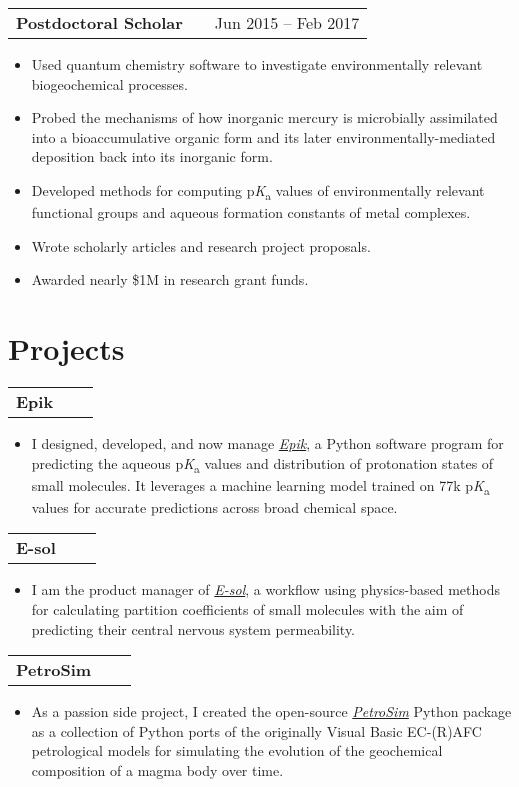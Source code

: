 \documentclass[a4paper,12pt]{article}
\makeatletter
\newenvironment{jobtitle}[2]
    {
    \vspace{4pt}
    \begin{tabularx}{\linewidth}{@{}l X r@{}}
    \textbf{#1} & \hfill &  #2 \\[3.75pt]
    \end{tabularx}
    \begin{minipage}[t]{\linewidth}
    \begin{itemize}[nosep, after=\strut, leftmargin=1em, itemsep=3pt, label=--]
    }
    {
    \end{itemize}
    \vspace{8pt}
    \end{minipage}
    }
\newenvironment{projecttitle}[1]
    {
    \begin{tabularx}{\linewidth}{@{}l X r@{}}
    \textbf{#1} & \hfill \\[3.75pt]
    \end{tabularx}
    }
    {
    }
\newenvironment{projectdescription}[0]
    {
    \vspace{4pt}
    \begin{minipage}[t]{\linewidth}
    \begin{itemize}[nosep, after=\strut, leftmargin=1em, itemsep=3pt]
    }
    {
    \end{itemize}
    \vspace{-8pt}
    \end{minipage}
    }
\makeatother
\begin{document}
\begin{jobtitle}{Postdoctoral Scholar}{Jun 2015 -- Feb 2017}
    \item Used quantum chemistry software to investigate environmentally relevant biogeochemical processes.
    \item Probed the mechanisms of how inorganic mercury is microbially assimilated into a bioaccumulative organic form and its later environmentally-mediated deposition back into its inorganic form.
    \item Developed methods for computing p\textit{K}\textsubscript{a} values of environmentally relevant functional groups and aqueous formation constants of metal complexes.
    \item Wrote scholarly articles and research project proposals.
    \item Awarded nearly \$1M in research grant funds.
\end{jobtitle}
  
\section{Projects}

\begin{projecttitle}{Epik}
\end{projecttitle}
\begin{projectdescription}
\item I designed, developed, and now manage \href{https://www.schrodinger.com/platform/products/epik/}{\textit{Epik}}, a Python software program for predicting the aqueous p\textit{K}\textsubscript{a} values and distribution of protonation states of small molecules. It leverages a machine learning model trained on 77k p\textit{K}\textsubscript{a} values for accurate predictions across broad chemical space.  \\
\end{projectdescription}
\begin{projecttitle}{E-sol}
\end{projecttitle}
\begin{projectdescription}
\item I am the product manager of \href{https://pubs.acs.org/doi/abs/10.1021/acs.jcim.3c00150}{\textit{E-sol}}, a workflow using physics-based methods for calculating partition coefficients of small molecules with the aim of predicting their central nervous system permeability.  \\
\end{projectdescription}
\begin{projecttitle}{PetroSim}
\end{projecttitle}
\begin{projectdescription}
\item As a passion side project, I created the open-source \href{https://github.com/rynecjohnston/petrosim}{\textit{PetroSim}} Python package as a collection of Python ports of the originally Visual Basic EC-(R)AFC petrological models for simulating the evolution of the geochemical composition of a magma body over time.  \\
\end{projectdescription}
\end{document}
